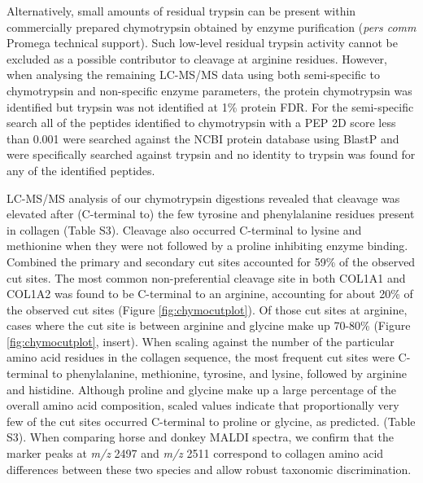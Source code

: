 \documentclass[preprint, 3p, authoryear]{elsarticle} %
\begin{document}
Alternatively, small amounts of residual trypsin can be present within commercially prepared chymotrypsin obtained by enzyme purification (\emph{pers comm} Promega technical support). Such low-level residual trypsin activity cannot be excluded as a possible contributor to cleavage at arginine residues. However, when analysing the remaining LC-MS/MS data using both semi-specific to chymotrypsin and non-specific enzyme parameters, the protein chymotrypsin was identified but trypsin was not identified at 1\% protein FDR. For the semi-specific search all of the peptides identified to chymotrypsin with a PEP 2D score less than 0.001 were searched against the NCBI protein database using BlastP and were specifically searched against trypsin and no identity to trypsin was found for any of the identified peptides.

LC-MS/MS analysis of our chymotrypsin digestions revealed that cleavage was elevated after (C-terminal to) the few tyrosine and phenylalanine residues present in collagen (Table S3). Cleavage also occurred C-terminal to lysine and methionine when they were not followed by a proline inhibiting enzyme binding. Combined the primary and secondary cut sites accounted for 59\% of the observed cut sites. The most common non-preferential cleavage site in both COL1A1 and COL1A2 was found to be C-terminal to an arginine, accounting for about 20\% of the observed cut sites (Figure \ref{fig:chymocutplot}). Of those cut sites at arginine, cases where the cut site is between arginine and glycine make up 70-80\% (Figure \ref{fig:chymocutplot}, insert). When scaling against the number of the particular amino acid residues in the collagen sequence, the most frequent cut sites were C-terminal to phenylalanine, methionine, tyrosine, and lysine, followed by arginine and histidine. Although proline and glycine make up a large percentage of the overall amino acid composition, scaled values indicate that proportionally very few of the cut sites occurred C-terminal to proline or glycine, as predicted. (Table S3). When comparing horse and donkey MALDI spectra, we confirm that the marker peaks at \emph{m/z} 2497 and \emph{m/z} 2511 correspond to collagen amino acid differences between these two species and allow robust taxonomic discrimination.
\end{document}
